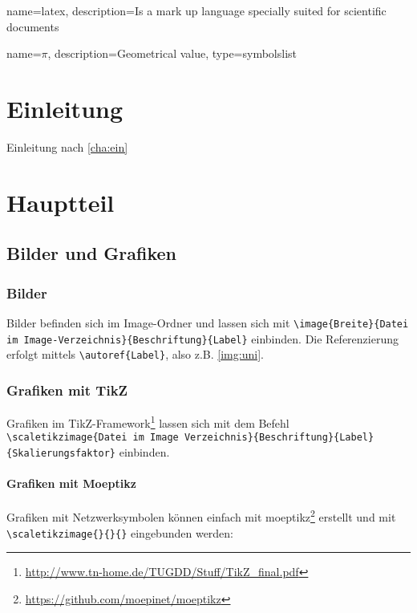 
{
        name=latex,
        description={Is a mark up language specially suited for scientific documents}
}

{
        name=\ensuremath{\pi},
        description={Geometrical value},
        type=symbolslist
}

\lstset{language=TeX}

\chapter{Einleitung}\label{cha:ein}
Einleitung nach \autoref{cha:ein}

\chapter{Hauptteil}\label{cha:haupt}
\section{Bilder und Grafiken}\label{sec:grafiken}

\subsection{Bilder}\label{subsec:bilder}
Bilder befinden sich im Image-Ordner und lassen sich mit \lstinline|\image{Breite}{Datei im Image-Verzeichnis}{Beschriftung}{Label}| einbinden.  Die Referenzierung erfolgt mittels \lstinline|\autoref{Label}|, also z.B. \autoref{img:uni}.

\subsection{Grafiken mit TikZ}
Grafiken im TikZ-Framework\footnote{\url{http://www.tn-home.de/TUGDD/Stuff/TikZ_final.pdf}} lassen sich mit dem Befehl \lstinline|\scaletikzimage{Datei im Image Verzeichnis}{Beschriftung}{Label}{Skalierungsfaktor}| einbinden. 

\subsubsection{Grafiken mit Moeptikz}
Grafiken mit Netzwerksymbolen können einfach mit moeptikz\footnote{\url{https://github.com/moepinet/moeptikz}} erstellt und mit \lstinline|\scaletikzimage{}{}{}| eingebunden werden:


